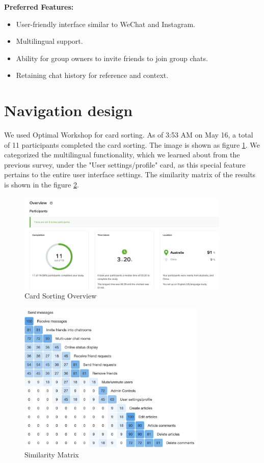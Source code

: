 \documentclass[12pt]{article}
\begin{document}
\textbf{Preferred Features:} 
\begin{itemize}
    \item User-friendly interface similar to WeChat and Instagram.
    \item Multilingual support.
    \item Ability for group owners to invite friends to join group chats.
    \item Retaining chat history for reference and context.
\end{itemize}

\newpage

\section{Navigation design}
\hspace{2em}We used Optimal Workshop for card sorting. As of 3:53 AM on May 16, a total of 11 participants completed the card sorting. The image is shown as figure \ref{cardsorting_overview}. We categorized the multilingual functionality, which we learned about from the previous survey, under the "User settings/profile" card, as this special feature pertains to the entire user interface settings. The similarity matrix of the results is shown in the figure \ref{similarity_matrix}.

\begin{figure}[H]
    \centering
    \includegraphics[width=0.9\textwidth]{graphs/cardsorting_overview.jpg}
    \caption{Card Sorting Overview}
    \label{cardsorting_overview}
\end{figure}

\begin{figure}[H]
    \centering
    \includegraphics[width=0.8\textwidth]{graphs/Similarity_Matrix.png}
    \caption{Similarity Matrix}
    \label{similarity_matrix}
\end{figure}
\end{document}

